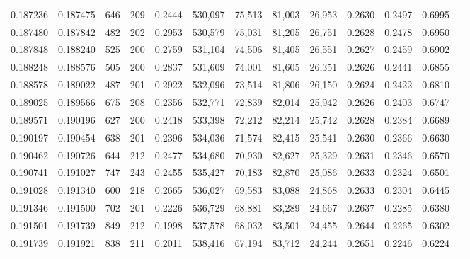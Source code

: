\begin{tabular}{rrrrrrrrrrrrr}
0.187236 & 0.187475 &   646 & 209 &                                     0.2444 & 530,097 &  75,513 &  81,003 &  26,953 & 0.2630 & 0.2497 & 0.6995 \\
0.187480 & 0.187842 &   482 & 202 &                                     0.2953 & 530,579 &  75,031 &  81,205 &  26,751 & 0.2628 & 0.2478 & 0.6950 \\
0.187848 & 0.188240 &   525 & 200 &                                     0.2759 & 531,104 &  74,506 &  81,405 &  26,551 & 0.2627 & 0.2459 & 0.6902 \\
0.188248 & 0.188576 &   505 & 200 &                                     0.2837 & 531,609 &  74,001 &  81,605 &  26,351 & 0.2626 & 0.2441 & 0.6855 \\
0.188578 & 0.189022 &   487 & 201 &                                     0.2922 & 532,096 &  73,514 &  81,806 &  26,150 & 0.2624 & 0.2422 & 0.6810 \\
0.189025 & 0.189566 &   675 & 208 &                                     0.2356 & 532,771 &  72,839 &  82,014 &  25,942 & 0.2626 & 0.2403 & 0.6747 \\
0.189571 & 0.190196 &   627 & 200 &                                     0.2418 & 533,398 &  72,212 &  82,214 &  25,742 & 0.2628 & 0.2384 & 0.6689 \\
0.190197 & 0.190454 &   638 & 201 &                                     0.2396 & 534,036 &  71,574 &  82,415 &  25,541 & 0.2630 & 0.2366 & 0.6630 \\
0.190462 & 0.190726 &   644 & 212 &                                     0.2477 & 534,680 &  70,930 &  82,627 &  25,329 & 0.2631 & 0.2346 & 0.6570 \\
0.190741 & 0.191027 &   747 & 243 &                                     0.2455 & 535,427 &  70,183 &  82,870 &  25,086 & 0.2633 & 0.2324 & 0.6501 \\
0.191028 & 0.191340 &   600 & 218 &                                     0.2665 & 536,027 &  69,583 &  83,088 &  24,868 & 0.2633 & 0.2304 & 0.6445 \\
0.191346 & 0.191500 &   702 & 201 &                                     0.2226 & 536,729 &  68,881 &  83,289 &  24,667 & 0.2637 & 0.2285 & 0.6380 \\
0.191501 & 0.191739 &   849 & 212 &                                     0.1998 & 537,578 &  68,032 &  83,501 &  24,455 & 0.2644 & 0.2265 & 0.6302 \\
0.191739 & 0.191921 &   838 & 211 &                                     0.2011 & 538,416 &  67,194 &  83,712 &  24,244 & 0.2651 & 0.2246 & 0.6224 \\

\end{tabular}
